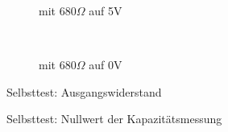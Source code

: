 \begin{figure}[H]
  \begin{subfigure}[b]{9cm}
  \centering
    \resizebox{9cm}{!}{}
    \caption{mit \(680 \Omega\) auf 5V}
    \label{fig:SelfTRoL}
  \end{subfigure}
  ~
  \begin{subfigure}[b]{9cm}
  \centering
    \resizebox{9cm}{!}{}
    \caption{mit \(680 \Omega\) auf 0V}
    \label{fig:SelfTRoH}
  \end{subfigure}
  \caption{Selbsttest: Ausgangswiderstand}
\end{figure}

\begin{figure}[H]
\centering

\caption{Selbsttest: Nullwert der Kapazit\"atsmessung}
\label{fig:SelfTcap}
\end{figure}

